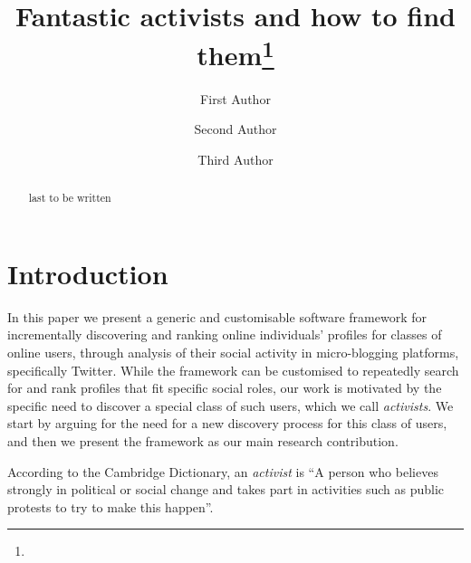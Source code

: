 \documentclass[runningheads]{llncs}
\begin{document}
%
\title{Fantastic activists and how to find them\thanks{}}
%
%
\author{First Author \and
Second Author \and
Third Author}
%
%
%
\maketitle              %
%
\begin{abstract}
last to be written
\end{abstract}
%


%
%
\section{Introduction}

In this paper we present a generic and customisable software  framework for incrementally discovering and ranking online individuals' profiles for classes of online users, through analysis of their social activity in micro-blogging platforms, specifically Twitter.
While the framework can be customised to repeatedly search for and rank profiles that fit specific social roles, our work is motivated by the specific need to discover a special class of such users, which we call \textit{activists}. 
We start by arguing for the need for a new discovery process for this class of users, and then we present the framework as our main research contribution.

According to the Cambridge Dictionary, an \textit{activist} is  ``A person who believes strongly in political or social change and takes part in activities such as public protests to try to make this happen''.
\end{document}

